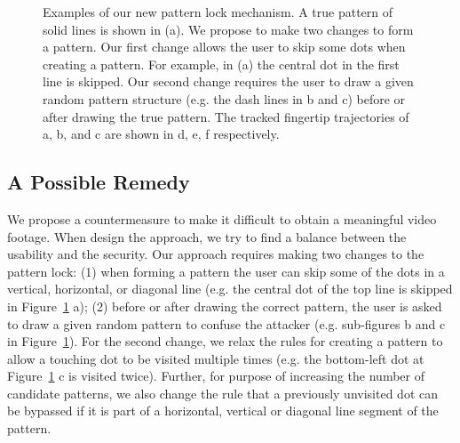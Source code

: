 \begin{figure}[!t]
{        }
        \vspace{-2mm}
        \caption{Examples of our new pattern lock mechanism. A true pattern of solid lines is shown
        in (a). We propose to make two changes to form a pattern.
        Our first change allows the user to skip some dots when creating a pattern.
        For example, in (a) the central dot in the first line is skipped.
        Our second change requires the user to draw a given random pattern structure (e.g. the dash lines in b and c)  before or after drawing the true pattern.
        The tracked fingertip trajectories of a, b, and c are shown in d, e, f respectively.
        }
        \label{fig:protection}
        \vspace{-6mm}
    \end{figure}


\subsection{A Possible Remedy}
\label{section: potential-remedy}
We propose a countermeasure to make it difficult to obtain a meaningful video footage. When design the approach, we try
to find a balance between the usability and the security. Our approach requires making two  changes to the pattern
lock: (1) when forming a pattern the user can skip some of the dots in a vertical, horizontal, or diagonal line
(e.g. the central dot of the top line is skipped in Figure~\ref{fig:protection} a); (2) before or after drawing the correct pattern, the user is asked to draw a given random
pattern to confuse the attacker (e.g. sub-figures b and c in Figure~\ref{fig:protection}). For the second change, we relax the rules for
creating a pattern to allow a touching dot to be visited multiple times (e.g. the bottom-left dot at
Figure~\ref{fig:protection} c is visited twice). Further, for purpose of increasing the number of candidate
patterns, we also change the rule that a previously unvisited dot can be bypassed if it is part of a horizontal,
vertical or diagonal line segment of the pattern.

